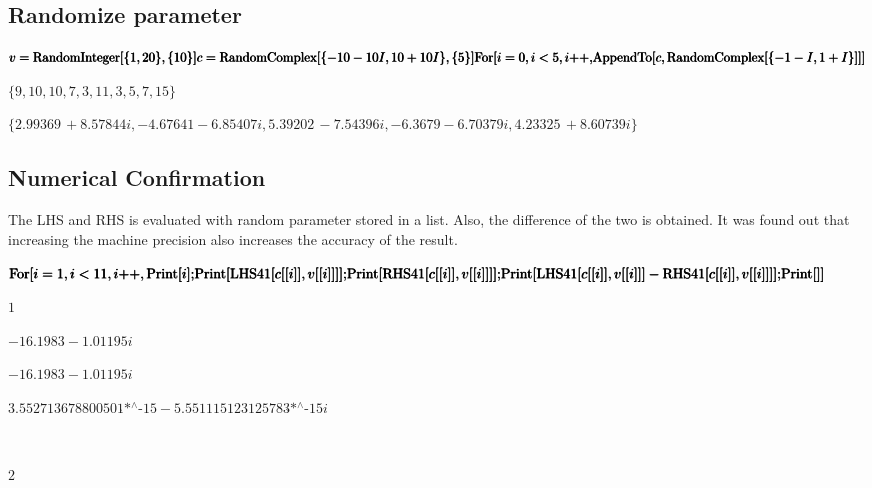 \subsection*{Randomize parameter}

\begin{doublespace}
\noindent\(\pmb{v=\text{RandomInteger}[\{1,20\},\{10\}]}\\
\pmb{c=\text{RandomComplex}[\{-10-10I,10+10I\},\{5\}]}\\
\pmb{\text{For}[i=0,i<5,i\text{++},}
\pmb{\text{AppendTo}[c,\text{RandomComplex}[\{-1-I,1+I\}]]]}\)
\end{doublespace}

\begin{doublespace}
\noindent\(\{9,10,10,7,3,11,3,5,7,15\}\)
\end{doublespace}

\begin{doublespace}
\noindent\(\{2.99369\, +8.57844 i,-4.67641-6.85407 i,5.39202\, -7.54396 i,-6.3679-6.70379 i,4.23325\, +8.60739 i\}\)
\end{doublespace}

\subsection*{Numerical Confirmation}

The LHS and RHS is evaluated with random parameter stored in a list. Also, the difference of the two is obtained. It was found out that increasing the machine precision also increases the accuracy of the result.

\begin{doublespace}
\noindent\(\pmb{\text{For}[i=1,i<11,i\text{++},\text{Print}[i];}
\pmb{\text{Print}[\text{LHS41}[c[[i]],v[[i]]]];}
\pmb{\text{Print}[\text{RHS41}[c[[i]],v[[i]]]];}\\
\pmb{\text{Print}[\text{LHS41}[c[[i]],v[[i]]]-\text{RHS41}[c[[i]],v[[i]]]];}\pmb{\text{Print}[]]}\)
\end{doublespace}

\noindent\(1\)

\noindent\(-16.1983-1.01195 i\)

\noindent\(-16.1983-1.01195 i\)

\noindent\(\text{3.552713678800501$\grave{ }$*${}^{\wedge}$-15}-\text{5.551115123125783$\grave{ }$*${}^{\wedge}$-15} i\)

\noindent\(\text{}\)

\noindent\(2\)

